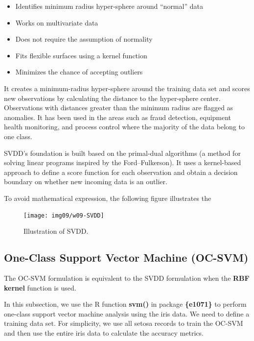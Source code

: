 \documentclass[
]{book}
\providecommand{\tightlist}{%
  \setlength{\itemsep}{0pt}\setlength{\parskip}{0pt}}
\begin{document}
\begin{itemize}
\tightlist
\item
  Identifies minimum radius hyper-sphere around ``normal'' data
\item
  Works on multivariate data
\item
  Does not require the assumption of normality
\item
  Fits flexible surfaces using a kernel function
\item
  Minimizes the chance of accepting outliers
\end{itemize}

It creates a minimum-radius hyper-sphere around the training data set and scores new observations by calculating the distance to the hyper-sphere center. Observations with distances greater than the minimum radius are flagged as anomalies. It has been used in the areas such as fraud detection, equipment health monitoring, and process control where the majority of the data belong to one class.

SVDD's foundation is built based on the primal-dual algorithms (a method for solving linear programs inspired by the Ford--Fulkerson). It uses a kernel-based approach to define a score function for each observation and obtain a decision boundary on whether new incoming data is an outlier.

To avoid mathematical expression, the following figure illustrates the

\begin{figure}

{\centering \texttt{[image: img09/w09-SVDD]} 

}

\caption{Illustration of SVDD.}\label{fig:unnamed-chunk-243}
\end{figure}

\hypertarget{one-class-support-vector-machine-oc-svm}{%
\subsection{One-Class Support Vector Machine (OC-SVM)}\label{one-class-support-vector-machine-oc-svm}}

The OC-SVM formulation is equivalent to the SVDD formulation when the \textbf{RBF kernel} function is used.

In this subsection, we use the R function \textbf{svm()} in package \textbf{\{e1071\}} to perform one-class support vector machine analysis using the iris data. We need to define a training data set. For simplicity, we use all setosa records to train the OC-SVM and then use the entire iris data to calculate the accuracy metrics.
\end{document}
